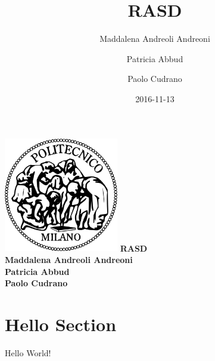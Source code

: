 \documentclass{article}
\title{RASD}
\date{2016-11-13}
\author{
	Maddalena Andreoli Andreoni
	\and
	Patricia Abbud
	\and
	Paolo Cudrano
}
\begin{document}
	\begin{titlepage}
	    \centering
	    \includegraphics[width=5cm]{img/polimi_logo.png} %
	    \vfill
	    {\bfseries\Large
	        RASD\\
	        \vskip4cm
	        Maddalena Andreoli Andreoni\\
					Patricia Abbud\\
	        Paolo Cudrano\\
	    }    
	    \vfill
	    \vfill
	\end{titlepage}

	\tableofcontents
	\newpage	
  
  \section{Hello Section}
		Hello World!
		
	\newpage
	\begin{appendix}
	  \listoffigures
	  \listoftables
	\end{appendix}
\end{document}
